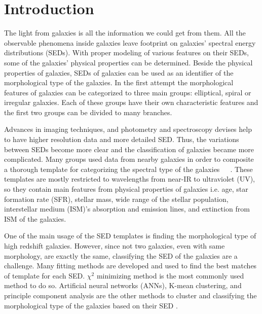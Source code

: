 \section{Introduction}
\label{sec: intro}
The light from galaxies is all the information we could get from them. 
All the observable phenomena inside galaxies leave footprint on galaxies' spectral energy distributions (SEDs).
With proper modeling of various features on their SEDs, some of the galaxies' physical properties can be determined.
Beside the physical properties of galaxies, SEDs of galaxies can be used as an identifier of the morphological type of the galaxies.
In the first attempt the morphological features of galaxies can be categorized to three main groups: elliptical, spiral or irregular galaxies.
Each of these groups have their own characteristic features and the first two groups can be divided to many branches.

Advances in imaging techniques, and photometry and spectroscopy devises help to have higher resolution data and more detailed SED. 
Thus, the variations between SEDs become more clear and the classification of galaxies became more complicated.
Many groups used data from nearby galaxies in order to composite a thorough template for categorizing the spectral type of the galaxies~\citep[e.g.][]{Kinney93}~\citep[][hereafter K96]{Kinney96}~\citep[][]{Bershady00}.%
These templates are mostly restricted to wavelengths from near-IR to ultraviolet (UV), so they contain main features from physical properties of galaxies i.e. age, star formation rate (SFR), stellar mass, wide range of the stellar population, interstellar medium (ISM)'s absorption and emission lines, and extinction from ISM of the galaxies.

One of the main usage of the SED templates is finding the morphological type of high redshift galaxies. 
However, since not two galaxies, even with same morphology, are exactly the same, classifying the SED of the galaxies are a challenge.
Many fitting methods are developed and used to find the best matches of template for each SED.
$\chi^2$ minimizing method is the most commonly used method to do so. 
Artificial neural networks (ANNs), K-mean clustering, and principle component analysis are the other methods to cluster and classifying the morphological type of the galaxies based on their SED \citep[e.g.][]{Allen13,Ordov14,Shi15}.

